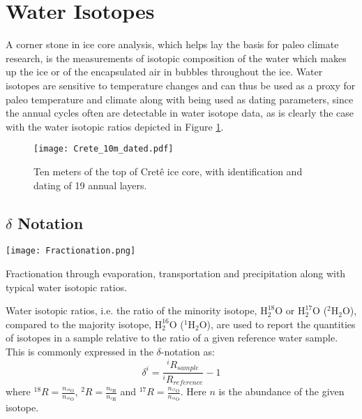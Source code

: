 \documentclass[../../CompleteThesis2/Complete_2ndDraft]{subfiles}
\begin{document}
\section[Water Isotopes][Water Isotopes]{Water Isotopes}
\label{Sec:Ice_WaterIsotopes}

A corner stone in ice core analysis, which helps lay the basis for paleo climate research, is the measurements of isotopic composition of the water which makes up the ice or of the encapsulated air in bubbles throughout the ice. Water isotopes are sensitive to temperature changes and can thus be used as a proxy for paleo temperature and climate along with being used as dating parameters, since the annual cycles often are detectable in water isotope data, as is clearly the case with the water isotopic ratios depicted in Figure \ref{Fig:ICE_Crete_10m_dated}.

\begin{figure}[h]
	\centering
	\texttt{[image: Crete\_10m\_dated.pdf]}
	\caption[10 m of Crête ice core with dating.]{\small Ten meters of the top of Cretê ice core, with identification and dating of 19 annual layers.}
	\label{Fig:ICE_Crete_10m_dated}
\end{figure}


\subsection[$\delta$ Notation]{$\delta$ Notation}
\label{Subsec:Ice_WaterIsotopes_deltaNotation}
\begin{marginfigure}
	\centering
	\texttt{[image: Fractionation.png]}
	\caption[Fractionation]{\footnotesize Fractionation through evaporation, transportation and precipitation along with typical water isotopic ratios.}
	\label{Fig:ICE_ISO_Fractionation}
\end{marginfigure}
Water isotopic ratios, i.e. the ratio of the minority isotope, ${\text{H}_2^{18}\text{O}}$ or ${\text{H}_2^{17}\text{O}}$ ($^2\text{H}_2\text{O}$), compared to the majority isotope, ${\text{H}_2^{16}\text{O}}$ ($^1\text{H}_2\text{O}$), are used to report the quantities of isotopes in a sample relative to the ratio of a given reference water sample. This is commonly expressed in the $\delta$-notation as:
\begin{equation}
	\delta^i = \frac{^iR_{sample}}{^iR_{reference}} - 1		
\end{equation}
where $^{18}R = \frac{n_{^{18}\text{O}}}{n_{^{16}\text{O}}}$, $^{2}R = \frac{n_{^{2}\text{H}}}{n_{^{1}\text{H}}}$  and $^{17}R = \frac{n_{^{17}\text{O}}}{n_{^{16}\text{O}}}$. Here $n$ is the abundance of the given isotope.%
\end{document}
